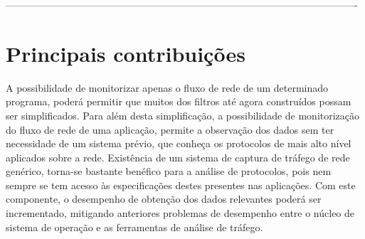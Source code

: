 ----------------------------------------------------------------------------------------------------------

\section{Principais contribuições} 
\label{sec:intro_contribuicoes}

A possibilidade de monitorizar apenas o fluxo de rede de um determinado programa, poderá permitir que muitos dos filtros até agora construídos possam ser simplificados.
Para além desta simplificação, a possibilidade de monitorização do fluxo de rede de uma aplicação, permite a observação dos dados sem ter necessidade de um sistema prévio, que conheça os protocolos de mais alto nível aplicados sobre a rede.
Existência de um sistema de captura de tráfego de rede genérico, torna-se bastante benéfico para a análise de protocolos, pois nem sempre se tem acesso às especificações destes presentes nas aplicações.
Com este componente, o desempenho de obtenção dos dados relevantes poderá ser incrementado, mitigando anteriores problemas de desempenho entre o núcleo de sistema de operação e as ferramentas de análise de tráfego.








